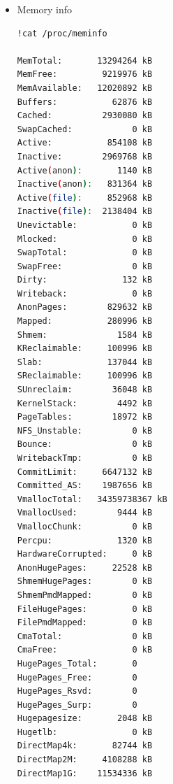 \documentclass[12pt,english]{report}
\begin{document}
\begin{itemize}
\begin{lstlisting}[language={bash},label={lst:cpuspec},caption={CPU spec}]
processor	: 1
vendor_id	: GenuineIntel
cpu family	: 6
model		: 79
model name	: Intel(R) Xeon(R) CPU @ 2.20GHz
stepping	: 0
microcode	: 0xffffffff
cpu MHz		: 2199.998
cache size	: 56320 KB
physical id	: 0
siblings	: 2
core id		: 0
cpu cores	: 1
apicid		: 1
initial apicid	: 1
fpu		: yes
fpu_exception	: yes
cpuid level	: 13
wp		: yes
flags		: fpu vme de pse tsc msr pae mce cx8 apic sep mtrr pge mca cmov pat pse36 clflush mmx fxsr sse sse2 ss ht syscall nx pdpe1gb rdtscp lm constant_tsc rep_good nopl xtopology nonstop_tsc cpuid tsc_known_freq pni pclmulqdq ssse3 fma cx16 pcid sse4_1 sse4_2 x2apic movbe popcnt aes xsave avx f16c rdrand hypervisor lahf_lm abm 3dnowprefetch invpcid_single ssbd ibrs ibpb stibp fsgsbase tsc_adjust bmi1 hle avx2 smep bmi2 erms invpcid rtm rdseed adx smap xsaveopt arat md_clear arch_capabilities
bugs		: cpu_meltdown spectre_v1 spectre_v2 spec_store_bypass l1tf mds swapgs taa mmio_stale_data retbleed
bogomips	: 4399.99
clflush size	: 64
cache_alignment	: 64
address sizes	: 46 bits physical, 48 bits virtual
power management:
\end{lstlisting}
\item Memory info
\begin{lstlisting}[language={bash},label={lst:meminfo},caption={Memory information}]
!cat /proc/meminfo

MemTotal:       13294264 kB
MemFree:         9219976 kB
MemAvailable:   12020892 kB
Buffers:           62876 kB
Cached:          2930080 kB
SwapCached:            0 kB
Active:           854108 kB
Inactive:        2969768 kB
Active(anon):       1140 kB
Inactive(anon):   831364 kB
Active(file):     852968 kB
Inactive(file):  2138404 kB
Unevictable:           0 kB
Mlocked:               0 kB
SwapTotal:             0 kB
SwapFree:              0 kB
Dirty:               132 kB
Writeback:             0 kB
AnonPages:        829632 kB
Mapped:           280996 kB
Shmem:              1584 kB
KReclaimable:     100996 kB
Slab:             137044 kB
SReclaimable:     100996 kB
SUnreclaim:        36048 kB
KernelStack:        4492 kB
PageTables:        18972 kB
NFS_Unstable:          0 kB
Bounce:                0 kB
WritebackTmp:          0 kB
CommitLimit:     6647132 kB
Committed_AS:    1987656 kB
VmallocTotal:   34359738367 kB
VmallocUsed:        9444 kB
VmallocChunk:          0 kB
Percpu:             1320 kB
HardwareCorrupted:     0 kB
AnonHugePages:     22528 kB
ShmemHugePages:        0 kB
ShmemPmdMapped:        0 kB
FileHugePages:         0 kB
FilePmdMapped:         0 kB
CmaTotal:              0 kB
CmaFree:               0 kB
HugePages_Total:       0
HugePages_Free:        0
HugePages_Rsvd:        0
HugePages_Surp:        0
Hugepagesize:       2048 kB
Hugetlb:               0 kB
DirectMap4k:       82744 kB
DirectMap2M:     4108288 kB
DirectMap1G:    11534336 kB
\end{lstlisting}

\end{itemize}
\end{document}
